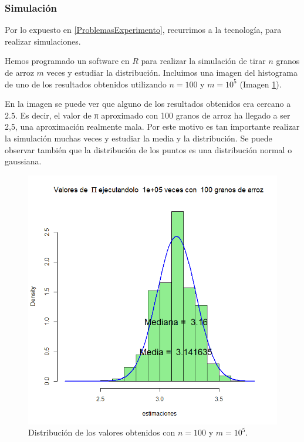 \subsubsection{Simulación}

Por lo expuesto en \ref{ProblemasExperimento}, recurrimos a la tecnología, para realizar simulaciones.

Hemos programado un software en $R$ para realizar la simulación de tirar $n$ granos de arroz $m$ veces y estudiar la distribución.
%
Incluimos una imagen del histograma de uno de los resultados obtenidos utilizando $n=100$ y $m=10^5$ (Imagen \ref{imgpidist}). 

En la imagen se puede ver que alguno de los resultados obtenidos era cercano a $2.5$.
%
Es decir, el valor de π aproximado con 100 granos de arroz ha llegado a ser 2,5, una aproximación realmente mala.
%
Por este motivo es tan importante realizar la simulación muchas veces y estudiar la media y la distribución.
%
Se puede observar también que la distribución de los puntos es una distribución normal o gaussiana.

\begin{figure}[hbtp]
\centering
\includegraphics[scale=0.5]{img/piimagen.png}
\caption{Distribución de los valores obtenidos con $n=100$ y $m=10^5$.}
\label{imgpidist}
\end{figure}






